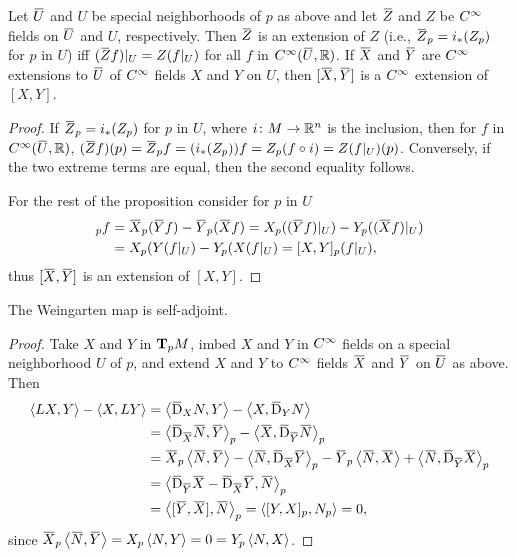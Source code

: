 \documentclass[../main]{subfiles}
\begin{document}
\begin{proposition} \label{prop:ch2.2.1}
Let $\xoverline{U}$ and $U$ be special neighborhoods of $p$ as above and let $\xoverline{Z}$ and $Z$ be $\CInfty$ fields on $\xoverline{U}$ and $U$, respectively. Then $\xoverline{Z}$ is an extension of $Z$ (i.e., $\xoverline{Z}_p=i_*(Z_p)$ for $p$ in $U$) iff $(\xoverline{Z}f)\vert_U=Z(f\vert_U)$ for all $f$ in $\CInfty(\xoverline{U},\bR)$. If $\xoverline{X}$ and $\xoverline{Y}$ are $\CInfty$ extensions to $\xoverline{U}$ of $\CInfty$ fields $X$ and $Y$ on $U$, then $[\xoverline{X},\xoverline{Y}]$ is a $\CInfty$ extension of $[X,Y]$.
\end{proposition}
\begin{proof}
If $\xoverline{Z}_p=i_*(Z_p)$ for $p$ in $U$, where $i\colon M\functionMaps\bR^n$ is the inclusion, then for $f$ in $\CInfty(\xoverline{U},\bR)$, $(\xoverline{Z}f)(p)=\xoverline{Z}_pf=(i_*(Z_p))f=Z_p(f\circ i)=Z(f\vert_U)(p)$. Conversely, if the two extreme terms are equal, then the second equality follows. 

For the rest of the proposition consider for $p$ in $U$
\begin{align*}
    [\xoverline{X},\xoverline{Y}]_pf&=\xoverline{X}_p(\xoverline{Y}f)-\xoverline{Y}_p(\xoverline{X}f)=X_p((\xoverline{Y}f)\vert_U)-Y_p((\xoverline{X}f)\vert_U)\\
    &=X_p(Y(f\vert_U)-Y_p(X(f\vert_U)=[X,Y]_p(f\vert_U),
\end{align*}
thus $[\xoverline{X},\xoverline{Y}]$ is an extension of $[X,Y]$.
\end{proof}

\begin{theorem} \label{thm:ch2.2.2}
The Weingarten map is self-adjoint.
\end{theorem}
\begin{proof}
Take $X$ and $Y$ in $\tangentspace{M}{p}$, imbed $X$ and $Y$ in $\CInfty$ fields on a special neighborhood $U$ of $p$, and extend $X$ and $Y$ to $\CInfty$ fields $\xoverline{X}$ and $\xoverline{Y}$ on $\xoverline{U}$ as above. Then
\begin{align*}
    \ip{LX}{Y}-\ip{X}{LY}&=\ip{\covariant_XN}{Y}-\ip{X}{\covariant_YN}\\
    &=\ip{\covariant_{\xoverline{X}}\xoverline{N}}{\xoverline{Y}}_p-\ip{\xoverline{X}}{\covariant_{\xoverline{Y}}\xoverline{N}}_p\\
    &=\xoverline{X}_p\ip{\xoverline{N}}{\xoverline{Y}}-\ip{\xoverline{N}}{\covariant_{\xoverline{X}}\xoverline{Y}}_p-\xoverline{Y}_p\ip{\xoverline{N}}{\xoverline{X}}+\ip{\xoverline{N}}{\covariant_{\xoverline{Y}}\xoverline{X}}_p\\
    &=\ip{\covariant_{\xoverline{Y}}\xoverline{X}-\covariant_{\xoverline{X}}\xoverline{Y}}{\xoverline{N}}_p\\
    &=\ip{[\xoverline{Y},\xoverline{X}]}{\xoverline{N}}_p=\ip{[Y,X]_p}{N_p}=0,
\end{align*}
since $\xoverline{X}_p\ip{\xoverline{N}}{\xoverline{Y}}=X_p\ip{N}{Y}=0=Y_p\ip{N}{X}$.
\end{proof}
\end{document}
